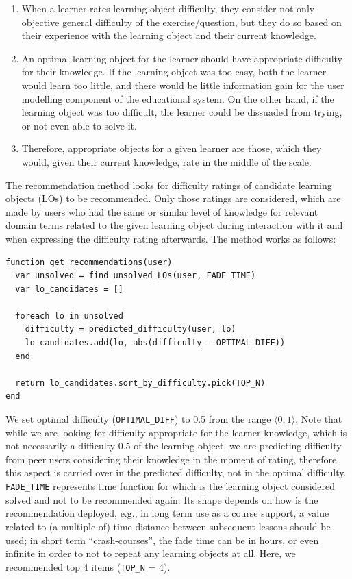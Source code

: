 \documentclass{llncs}
\begin{document}
\begin{enumerate}
\item When a learner rates learning object difficulty, they consider not only objective general difficulty of the exercise/question, but they do so based on their experience with the learning object and their current knowledge.
\item An optimal learning object for the learner should have appropriate difficulty for their knowledge. If the learning object was too easy, both the learner would learn too little, and there would be little information gain for the user modelling component of the educational system. On the other hand, if the learning object was too difficult, the learner could be dissuaded from trying, or not even able to solve it.
\item Therefore, appropriate objects for a given learner are those, which they would, given their current knowledge, rate in the middle of the scale.
\end{enumerate}

The recommendation method looks for difficulty ratings of candidate learning objects (LOs) to be recommended. Only those ratings are considered, which are made by users who had the same or similar level of knowledge for relevant domain terms related to the given learning object during interaction with it and when expressing the difficulty rating afterwards. The method works as follows:

\begin{lstlisting}[language={}]
function get_recommendations(user)
  var unsolved = find_unsolved_LOs(user, FADE_TIME)
  var lo_candidates = []

  foreach lo in unsolved
    difficulty = predicted_difficulty(user, lo)
    lo_candidates.add(lo, abs(difficulty - OPTIMAL_DIFF))
  end

  return lo_candidates.sort_by_difficulty.pick(TOP_N)
end
\end{lstlisting}

We set optimal difficulty (\verb|OPTIMAL_DIFF|) to 0.5 from the range $\langle 0,1 \rangle$. Note that while we are looking for difficulty appropriate for the learner knowledge, which is not necessarily a difficulty 0.5 of the learning object, we are predicting difficulty from peer users considering their knowledge in the moment of rating, therefore this aspect is carried over in the predicted difficulty, not in the optimal difficulty. \verb|FADE_TIME| represents time function for which is the learning object considered solved and not to be recommended again. Its shape depends on how is the recommendation deployed, e.g., in long term use as a course support, a value related to (a multiple of) time distance between subsequent lessons should be used; in short term ``crash-courses'', the fade time can be in hours, or even infinite in order to not to repeat any learning objects at all. Here, we recommended top 4 items (\verb|TOP_N| = 4).
\end{document}
